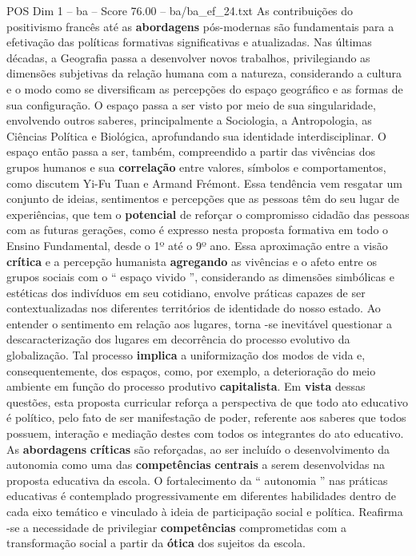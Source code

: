 \begin{textsample}{POS Dim 1 – ba – Score 76.00 – ba/ba\_ef\_24.txt}
As contribuições do positivismo francês até as \textbf{abordagens} pós-modernas são fundamentais para a efetivação das políticas formativas significativas e atualizadas.
Nas últimas décadas, a Geografia passa a desenvolver novos trabalhos, privilegiando as dimensões subjetivas da relação humana com a natureza, considerando a cultura e o modo como se diversificam as percepções do espaço geográfico e as formas de sua configuração.
O espaço passa a ser visto por meio de sua singularidade, envolvendo outros saberes, principalmente a Sociologia, a Antropologia, as Ciências Política e Biológica, aprofundando sua identidade interdisciplinar.
O espaço então passa a ser, também, compreendido a partir das vivências dos grupos humanos e sua \textbf{correlação} entre valores, símbolos e comportamentos, como discutem Yi-Fu Tuan e Armand Frémont.
Essa tendência vem resgatar um conjunto de ideias, sentimentos e percepções que as pessoas têm do seu lugar de experiências, que tem o \textbf{potencial} de reforçar o compromisso cidadão das pessoas com as futuras gerações, como é expresso nesta proposta formativa em todo o Ensino Fundamental, desde o 1º até o 9º ano.
Essa aproximação entre a visão \textbf{crítica} e a percepção humanista \textbf{agregando} as vivências e o afeto entre os grupos sociais com o “ espaço vivido ”, considerando as dimensões simbólicas e estéticas dos indivíduos em seu cotidiano, envolve práticas capazes de ser contextualizadas nos diferentes territórios de identidade do nosso estado.
Ao entender o sentimento em relação aos lugares, torna -se inevitável questionar a descaracterização dos lugares em decorrência do processo evolutivo da globalização.
Tal processo \textbf{implica} a uniformização dos modos de vida e, consequentemente, dos espaços, como, por exemplo, a deterioração do meio ambiente em função do processo produtivo \textbf{capitalista}.
Em \textbf{vista} dessas questões, esta proposta curricular reforça a perspectiva de que todo ato educativo é político, pelo fato de ser manifestação de poder, referente aos saberes que todos possuem, interação e mediação destes com todos os integrantes do ato educativo.
As \textbf{abordagens} \textbf{críticas} são reforçadas, ao ser incluído o desenvolvimento da autonomia como uma das \textbf{competências} \textbf{centrais} a serem desenvolvidas na proposta educativa da escola.
O fortalecimento da “ autonomia ” nas práticas educativas é contemplado progressivamente em diferentes habilidades dentro de cada eixo temático e vinculado à ideia de participação social e política.
Reafirma -se a necessidade de privilegiar \textbf{competências} comprometidas com a transformação social a partir da \textbf{ótica} dos sujeitos da escola.

\end{textsample}
